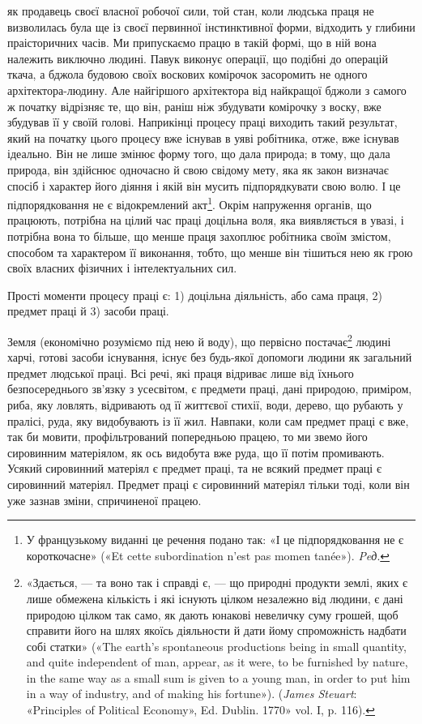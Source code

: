 \parcont{}  %
як продавець своєї власної робочої сили, той стан, коли людська
праця не визволилась була ще із своєї первинної інстинктивної
форми, відходить у глибини праісторичних часів. Ми припускаємо
працю в такій формі, що в ній вона належить виключно людині.
Павук виконує операції, що подібні до операцій ткача, а бджола
будовою своїх воскових комірочок засоромить не одного архітектора-людину.
Але найгіршого архітектора від найкращої
бджоли з самого ж початку відрізняє те, що він, раніш ніж збудувати
комірочку з воску, вже збудував її у своїй голові. Наприкінці
процесу праці виходить такий результат, який на початку
цього процесу вже існував в уяві робітника, отже, вже
існував ідеально. Він не лише змінює форму того, що дала природа;
в тому, що дала природа, він здійснює одночасно й свою
свідому мету, яка як закон визначає спосіб і характер його діяння
і якій він мусить підпорядкувати свою волю. І це підпорядковання
не є відокремлений акт\footnote*{
У французькому виданні це речення подано так: «І це підпорядковання
не є короткочасне» («Et cette subordination n’est pas momen
tanée»). \emph{Peд}.
}. Окрім напруження органів, що працюють,
потрібна на цілий час праці доцільна воля, яка виявляється
в увазі, і потрібна вона то більше, що менше праця захоплює
робітника своїм змістом, способом та характером її виконання,
тобто, що менше він тішиться нею як грою своїх власних
фізичних і інтелектуальних сил.

Прості моменти процесу праці є: 1) доцільна діяльність, або
сама праця, 2) предмет праці й 3) засоби праці.

Земля (економічно розуміємо під нею й воду), що первісно
постачає\footnote{«Здається, — та воно так і справді є, — що природні продукти
землі, яких є лише обмежена кількість і які існують цілком незалежно
від людини, є дані природою цілком так само, як дають юнакові невеличку
суму грошей, щоб справити його на шлях якоїсь діяльности й дати йому
спроможність надбати собі статки» («The earth’s spontaneous productions
being in small quantity, and quite independent of man, appear,
as it were, to be furnished by nature, in the same way as a small sum is given
to a young man, in order to put him in a way of industry, and of making
his fortune»). (\emph{James Steuart}: «Principles of Political Economy», Ed.
Dublin. 1770» vol. I, p. 116).}
людині харчі, готові засоби існування, існує без будь-якої
допомоги людини як загальний предмет людської праці.
Всі речі, які праця відриває лише від їхнього безпосереднього
зв’язку з усесвітом, є предмети праці, дані природою, приміром,
риба, яку ловлять, відривають од її життєвої стихії, води, дерево,
що рубають у пралісі, руда, яку видобувають із її жил. Навпаки, коли сам предмет праці є вже, так би мовити, профільтрований
попередньою працею, то ми звемо його сировинним матеріялом,
як ось видобута вже руда, що її потім промивають. Усякий сировинний
матеріял є предмет праці, та не всякий предмет праці є
сировинний матеріял. Предмет праці є сировинний матеріял тільки
тоді, коли він уже зазнав зміни, спричиненої працею.

